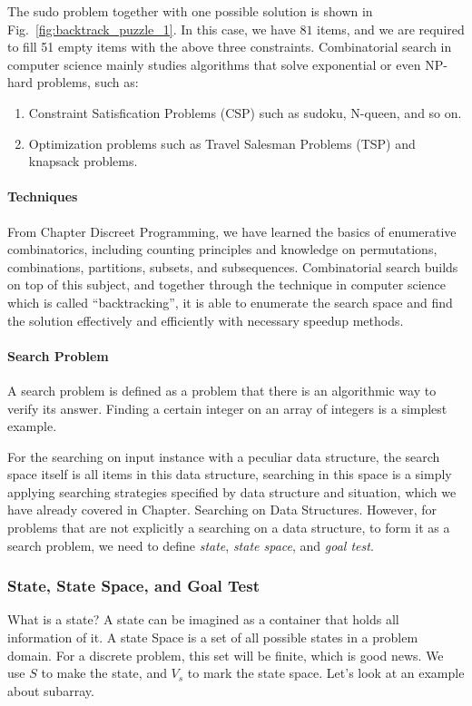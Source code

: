 \documentclass[../main.tex]{subfiles}
\begin{document}
The sudo problem together with one possible solution is shown in Fig.~\ref{fig:backtrack_puzzle_1}. In this case, we have $81$ items, and we are required to fill 51 empty items with the above three constraints. Combinatorial search in computer science mainly studies algorithms that solve exponential or even NP-hard problems, such as:
\begin{enumerate}
    \item Constraint Satisfication Problems (CSP) such as sudoku, N-queen, and so on.
    \item Optimization problems such as Travel Salesman Problems (TSP) and knapsack problems. 
\end{enumerate}

\paragraph{Techniques} From Chapter Discreet Programming, we have learned the basics of enumerative combinatorics, including counting principles and knowledge on permutations, combinations, partitions, subsets, and subsequences. Combinatorial search builds on top of this subject, and together through the technique in computer science which is called ``backtracking'', it is able to enumerate the search space   and find the solution effectively and efficiently with necessary speedup methods. 



\paragraph{Search Problem} A search problem is defined as a problem that there is an algorithmic way to verify its answer. Finding a certain integer on an array of integers is a simplest example. 

For the searching on input instance with a peculiar data structure, the search space itself is all items in this data structure, searching in this space is a simply applying searching strategies specified by data structure and situation, which we have already covered in Chapter. Searching on Data Structures. However, for problems that are not explicitly a searching on a data structure, to form it as a search problem, we need to define \textit{state}, \textit{state space}, and \textit{goal test}. 

\subsubsection{State, State Space, and Goal Test} What is a state? A state can be imagined as a container that holds all information of it. A state Space is a set of all possible states in a problem domain. For a discrete problem, this set will be finite, which is good news. We use $S$ to make the state, and $V_s$ to mark the state space. Let's look at an example about subarray.
\end{document}
